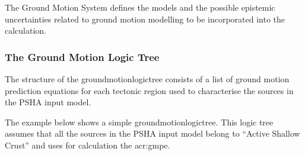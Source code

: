 The Ground Motion System defines the models and the possible epistemic
uncertainties related to ground motion modelling to be incorporated into the
calculation.

\subsubsection{The Ground Motion Logic Tree}
\label{ref:gmlt_example}

The structure of the \gls{groundmotionlogictree} consists of a list of ground
motion prediction equations for each tectonic region used to characterise the
sources in the PSHA input model.

The example below shows a simple \gls{groundmotionlogictree}. This logic tree
assumes that all the sources in the PSHA input model belong to ``Active
Shallow Crust'' and uses for calculation the \citet{chiou2008}
\gls{acr:gmpe}.


